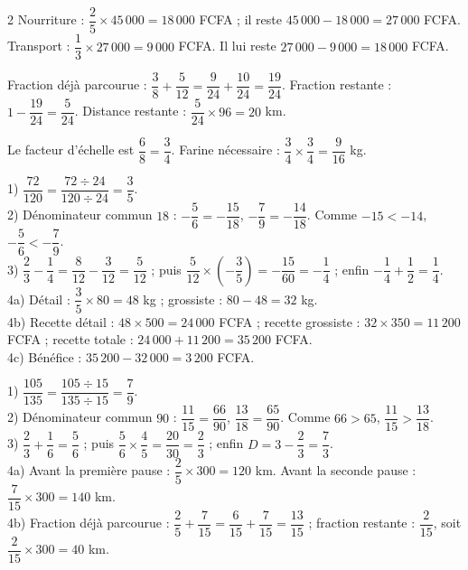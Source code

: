 \begin{multicols}{2}
Nourriture : $\dfrac25\times45\,000=18\,000$ FCFA ; il reste $45\,000-18\,000=27\,000$ FCFA.
Transport : $\dfrac13\times27\,000=9\,000$ FCFA. Il lui reste $27\,000-9\,000=18\,000$ FCFA.

Fraction déjà parcourue : $\dfrac38+\dfrac5{12}=\dfrac9{24}+\dfrac{10}{24}=\dfrac{19}{24}$.
Fraction restante : $1-\dfrac{19}{24}=\dfrac5{24}$. Distance restante :
$\dfrac5{24}\times96=20$ km.

Le facteur d'échelle est $\dfrac68=\dfrac34$. Farine nécessaire :
$\dfrac34\times\dfrac34=\dfrac9{16}$ kg.

1) $\dfrac{72}{120}=\dfrac{72\div24}{120\div24}=\dfrac35$.\\
2) Dénominateur commun $18$ : $-\dfrac56=-\dfrac{15}{18}$, $-\dfrac79=-\dfrac{14}{18}$. Comme
$-15<-14$, $-\dfrac56<-\dfrac79$.\\
3) $\dfrac23-\dfrac14=\dfrac8{12}-\dfrac3{12}=\dfrac5{12}$ ; puis
$\dfrac5{12}\times\left(-\dfrac35\right)=-\dfrac{15}{60}=-\dfrac14$ ; enfin
$-\dfrac14+\dfrac12=\dfrac14$.\\
4a) Détail : $\dfrac35\times80=48$ kg ; grossiste : $80-48=32$ kg.\\
4b) Recette détail : $48\times500=24\,000$ FCFA ; recette grossiste : $32\times350=11\,200$
FCFA ; recette totale : $24\,000+11\,200=35\,200$ FCFA.\\
4c) Bénéfice : $35\,200-32\,000=3\,200$ FCFA.

1) $\dfrac{105}{135}=\dfrac{105\div15}{135\div15}=\dfrac79$.\\
2) Dénominateur commun $90$ : $\dfrac{11}{15}=\dfrac{66}{90}$, $\dfrac{13}{18}=\dfrac{65}{90}$.
Comme $66>65$, $\dfrac{11}{15}>\dfrac{13}{18}$.\\
3) $\dfrac23+\dfrac16=\dfrac56$ ; puis $\dfrac56\times\dfrac45=\dfrac{20}{30}=\dfrac23$ ; enfin
$D=3-\dfrac23=\dfrac73$.\\
4a) Avant la première pause : $\dfrac25\times300=120$ km. Avant la seconde pause :
$\dfrac7{15}\times300=140$ km.\\
4b) Fraction déjà parcourue : $\dfrac25+\dfrac7{15}=\dfrac6{15}+\dfrac7{15}=\dfrac{13}{15}$ ;
fraction restante : $\dfrac2{15}$, soit $\dfrac2{15}\times300=40$ km.


\end{multicols}
